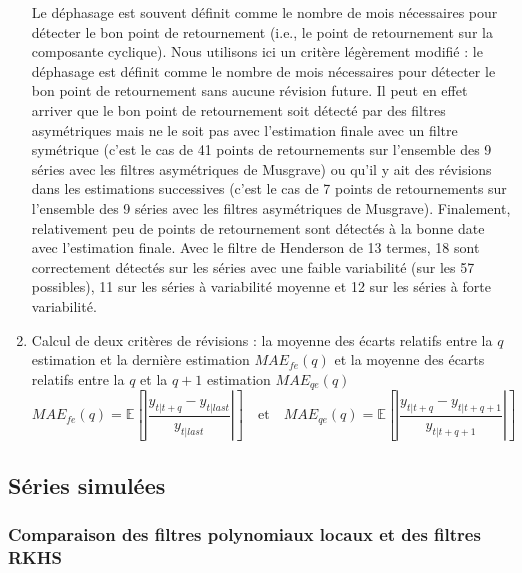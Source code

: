\documentclass[
  12pt,
  a4paper,french]{article}
\newcommand\1{\mathds{1}}
\begin{document}
\begin{enumerate}
  Le déphasage est souvent définit comme le nombre de mois nécessaires pour détecter le bon point de retournement (i.e., le point de retournement sur la composante cyclique).
  Nous utilisons ici un critère légèrement modifié : le déphasage est définit comme le nombre de mois nécessaires pour détecter le bon point de retournement sans aucune révision future.
  Il peut en effet arriver que le bon point de retournement soit détecté par des filtres asymétriques mais ne le soit pas avec l'estimation finale avec un filtre symétrique (c'est le cas de 41 points de retournements sur l'ensemble des 9 séries avec les filtres asymétriques de Musgrave) ou qu'il y ait des révisions dans les estimations successives (c'est le cas de 7 points de retournements sur l'ensemble des 9 séries avec les filtres asymétriques de Musgrave).
  Finalement, relativement peu de points de retournement sont détectés à la bonne date avec l'estimation finale.
  Avec le filtre de Henderson de 13 termes, 18 sont correctement détectés sur les séries avec une faible variabilité (sur les 57 possibles), 11 sur les séries à variabilité moyenne et 12 sur les séries à forte variabilité.
\item
  Calcul de deux critères de révisions : la moyenne des écarts relatifs entre la \(q\)\ieme{} estimation et la dernière estimation \(MAE_{fe}(q)\) et la moyenne des écarts relatifs entre la \(q\)\ieme{} et la \(q+1\)\ieme{} estimation \(MAE_{qe}(q)\)
  \[
  MAE_{fe}(q)=\mathbb E\left[
  \left|\frac{
  y_{t|t+q} -  y_{t|last}
  }{
   y_{t|last}
  }\right|
  \right]
  \quad\text{et}\quad
  MAE_{qe}(q)=\mathbb E\left[
  \left|\frac{
  y_{t|t+q} - y_{t|t+q+1}
  }{
  y_{t|t+q+1}
  }\right|
  \right]
  \]
\end{enumerate}

\hypertarget{suxe9ries-simuluxe9es}{%
\subsection{Séries simulées}\label{suxe9ries-simuluxe9es}}

\hypertarget{comparaison-des-filtres-polynomiaux-locaux-et-des-filtres-rkhs}{%
\subsubsection{Comparaison des filtres polynomiaux locaux et des filtres RKHS}\label{comparaison-des-filtres-polynomiaux-locaux-et-des-filtres-rkhs}}
\end{document}
